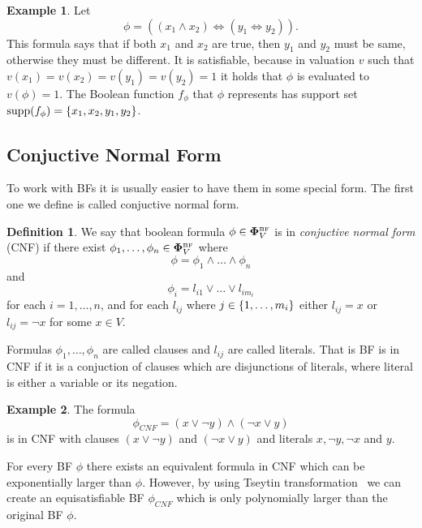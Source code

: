 \documentclass[
  digital, %
  color,
  twoside, %
  table,   %
  nolof,     %
  nolot,     %
]{fithesis3}
\let\setbuilder\set
\newcommand{\simpleset}[1]{\{{#1}\}}
\renewcommand{\set}[1]{\normalexpandarg\IfSubStr{#1}{|}{\setbuilder{#1}}{\simpleset{#1}}}
\theoremstyle{definition}
\newtheorem{definition}{Definition}
\newtheorem{example}{Example}
\theoremstyle{remark}
\newcommand{\BF}[1]{\mathbf{\Phi}_{#1}^{\normalfont{\text{\tiny BF}}}}
\newcommand{\supp}[1]{\mathrm{supp}(#1)}
\newcommand{\lequal}{\Leftrightarrow}
\begin{document}
\begin{example}
\label{ex:BF:prenex}
Let
\[\phi = ((x_1 \land x_2) \lequal (y_1 \lequal y_2)).\]
This formula says that if both $x_1$ and $x_2$ are true, then $y_1$ and $y_2$ must be same, otherwise they must be different. It is satisfiable, because in valuation $v$ such that $v(x_1) = v(x_2) = v(y_1) = v(y_2) = 1$ it holds that $\phi$ is evaluated to $v(\phi)=1$. The Boolean function $f_{\phi}$ that $\phi$ represents has support set $\supp{f_{\phi}} = \set{x_1, x_2, y_1, y_2}$.
\end{example}

\subsection{Conjuctive Normal Form}
\label{sec:BF:CNF}
To work with BFs it is usually easier to have them in some special form. The first one we define is called conjuctive normal form.

\begin{definition}
We say that boolean formula $\phi \in \BF{V}$ is in \emph{conjuctive normal form} (CNF) if there exist $\phi_1,\dots,\phi_n \in \BF{V}$ where
\[\phi = \phi_1 \land \dots \land \phi_n\]
and
\[\phi_i = l_{i1} \lor \dots \lor l_{i{m_i}}\]
for each $i = 1, \dots, n$, and for each $l_{ij}$ where $j \in \set{1,\dots,m_i}$ either $l_{ij} = x$ or $l_{ij} = \neg x$ for some $x \in V$.
\end{definition}
Formulas $\phi_1,\dots,\phi_n$ are called clauses and $l_{ij}$ are called literals. That is BF is in CNF if it is a conjuction of clauses which are disjunctions of literals, where literal is either a variable or its negation.

\begin{example}
The formula
\[\phi_{CNF} = (x \lor \neg y) \land (\neg x \lor y)\]
is in CNF with clauses $(x \lor \neg y)$ and $(\neg x \lor y)$ and literals $x,\neg y, \neg x$ and $y$.
\end{example}

For every BF $\phi$ there exists an equivalent formula in CNF which can be exponentially larger than $\phi$. However, by using Tseytin transformation~\cite{Tseitin} we can create an equisatisfiable BF $\phi_{CNF}$ which is only polynomially larger than the original BF $\phi$.
\end{document}
